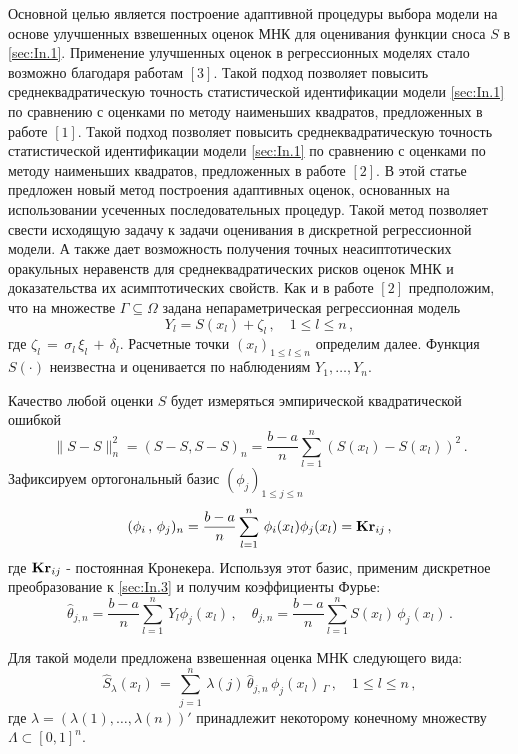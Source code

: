  Основной целью является построение адаптивной процедуры выбора модели на основе улучшенных взвешенных оценок МНК для оценивания функции сноса $S$ в \eqref{sec:In.1}. Применение улучшенных оценок в регрессионных моделях стало возможно благодаря работам $[3]$. Такой подход позволяет повысить среднеквадратическую точность статистической идентификации модели \eqref{sec:In.1} по сравнению с оценками по методу наименьших квадратов, предложенных в работе $[1]$. Такой подход позволяет повысить среднеквадратическую точность статистической идентификации модели \eqref{sec:In.1} по сравнению с оценками по методу наименьших квадратов, предложенных в работе $[2]$. В этой статье предложен новый метод построения адаптивных оценок, основанных на использовании усеченных последовательных процедур. Такой метод позволяет свести исходящую задачу к задачи оценивания в дискретной регрессионной модели. А также  дает возможность получения точных неасиптотических оракульных неравенств для среднеквадратических рисков оценок МНК и доказательства их асимптотических свойств.
 Как и в работе $[2]$ предположим, что на множестве $\Gamma\subseteq\Omega$
задана непараметрическая регрессионная модель
\begin{equation}\label{sec:In.3}
Y_{l}=S(x_{l})+\zeta_{l}\,,\quad  1\leqslant l\leqslant n\,,
\end{equation}
где $\zeta_{l}\,=\,\sigma_{l}\,\xi_{l}\,+\,\delta_{l}$. Расчетные точки
$(x_{l})_{1\leqslant l\leqslant n}$
определим далее. Функция $S(\cdot)$ неизвестна и оценивается по наблюдениям $Y_1,\ldots,Y_n$.

Качество любой оценки  ${S}$ будет измеряться эмпирической квадратической ошибкой
$$
\|{S}-S\|^2_n=({S}-S,{S}-S)_{n}
=\frac{b-a}{n}\sum^n_{l=1}({S}(x_{l})-S(x_{l}))^2\,.
$$
Зафиксируем ортогональный базис $(\phi_{j})_{1\leqslant j\leqslant n}$
\begin{equation}\label{sec:In.6}
(\phi_i\,,\,\phi_{j})_{n}=
\frac{b-a}{n} \sum^n_{l=1}\,\phi_i(x_{l})\phi_{j}(x_{l})= {\bf Kr}_{ij}\,,
\end{equation}
где ${\bf Kr}_{ij}$ - постоянная Кронекера.
Используя этот базис, применим дискретное преобразование к
\eqref{sec:In.3} и получим коэффициенты Фурье:
$$
{\hat \theta}_{j,n}=\frac{b-a}{n}\sum^n_{l=1}\,Y_{l}\phi_{j}(x_{l})\,,
\quad
\theta_{j,n}=\frac{b-a}{n}\sum^n_{l=1}S(x_{l})\,\phi_{j}(x_{l})\,.
$$

Для такой модели предложена взвешенная оценка МНК следующего вида:
\begin{equation}\label{sec:In.7}
\hat {{S}}_{\lambda}(x_{l})\,=\,\sum^n_{j=1}\,\lambda(j)\,{\hat \theta}_{j,n}\,\phi_{j}(x_{l})\,
_{\Gamma}\,,\quad 1\leqslant l\leqslant n\,,
\end{equation}
где $\lambda=(\lambda(1),\ldots,\lambda(n))'$
принадлежит некоторому конечному множеству $\Lambda\subset [0,1]^n$.

